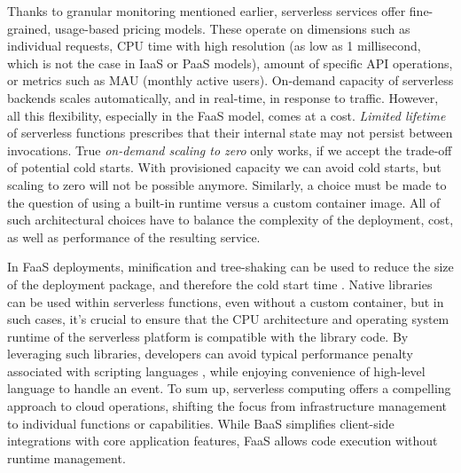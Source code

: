 Thanks to granular monitoring mentioned earlier, serverless services offer fine-grained, usage-based pricing models. These operate on dimensions such as individual requests, CPU time with high resolution (as low as 1 millisecond, which is not the case in IaaS or PaaS models), amount of specific API operations, or metrics such as MAU (monthly active users). On-demand capacity of serverless backends scales automatically, and in real-time, in response to traffic. However, all this flexibility, especially in the FaaS model, comes at a cost. \emph{Limited lifetime} \cite{hellerstein2018serverless} of serverless functions prescribes that their internal state may not persist between invocations. True \emph{on-demand scaling to zero} only works, if we accept the trade-off of potential cold starts. With provisioned capacity we can avoid cold starts, but scaling to zero will not be possible anymore. Similarly, a choice must be made to the question of using a built-in runtime versus a custom container image. All of such architectural choices have to balance the complexity of the deployment, cost, as well as performance \cite{dantas2022application} of the resulting service.



In FaaS deployments, minification and tree-shaking can be used to reduce the size of the deployment package, and therefore the cold start time \cite{puripunpinyo2017effect}. Native libraries can be used within serverless functions, even without a custom container, but in such cases, it's crucial to ensure that the CPU architecture and operating system runtime of the serverless platform is compatible with the library code. By leveraging such libraries, developers can avoid typical performance penalty associated with scripting languages \cite{ousterhout1998scripting}, while enjoying convenience of high-level language to handle an event. To sum up, serverless computing offers a compelling approach to cloud operations, shifting the focus from infrastructure management to individual functions or capabilities. While BaaS simplifies client-side integrations with core application features, FaaS allows code execution without runtime management.


